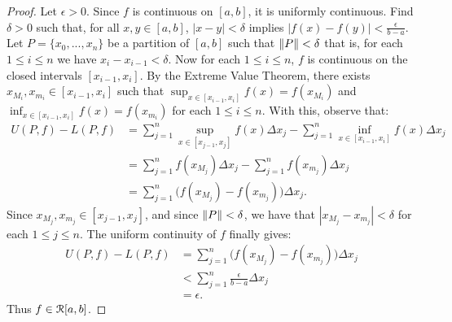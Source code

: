 \documentclass[11pt,twoside,openany]{memoir}
\begin{document}
        \begin{proof}
            Let $\epsilon > 0$. Since $f$ is continuous on $[a,b]$, it is uniformly continuous. Find $\delta > 0$ such that, for all $x,y \in [a,b]$, $|x-y| < \delta$ implies $|f(x) - f(y)| < \frac{\epsilon}{b-a}$. Let $P = \{x_0,...,x_n\}$ be a partition of $[a,b]$ such that $\left\lVert P \right\rVert < \delta$ \textemdash that is, for each $1 \leq i \leq n$ we have $x_i - x_{i-1} < \delta$. Now for each $1 \leq i \leq n$, $f$ is continuous on the closed intervals $[x_{i-1},x_i]$. By the Extreme Value Theorem, there exists $x_{M_i},x_{m_i} \in [x_{i-1},x_i]$ such that $\sup_{x \in [x_{i-1},x_i]}f(x) = f(x_{M_i})$ and $\inf_{x \in [x_{i-1},x_i]}f(x) = f(x_{m_i})$ for each $1 \leq i \leq n$. With this, observe that:
                \begin{equation*}
                \begin{split}
                    U(P,f) - L(P,f) 
                    & = \sum_{j = 1}^n \sup_{x \in [x_{j-1},x_j]}f(x)\Delta x_j - \sum_{j = 1}^n \inf_{x \in [x_{i-1},x_i]}f(x)\Delta x_j \\
                    & = \sum_{j = 1}^n f(x_{M_j})\Delta x_j - \sum_{j = 1}^n f(x_{m_j})\Delta x_j \\
                    & = \sum_{j=1}^n \bigl(f(x_{M_j}) - f(x_{m_j})\bigr)\Delta x_j.
                \end{split}
                \end{equation*}
            Since $x_{M_j},x_{m_j} \in [x_{j-1},x_j]$, and since $\left\lVert P \right\rVert < \delta$, we have that $|x_{M_j} - x_{m_j}| < \delta$ for each $1 \leq j \leq n$. The uniform continuity of $f$ finally gives:
                \begin{equation*}
                \begin{split}
                    U(P,f) - L(P,f)
                    & = \sum_{j=1}^n \bigl(f(x_{M_j}) - f(x_{m_j})\bigr)\Delta x_j \\
                    & < \sum_{j = 1}^n \frac{\epsilon}{b-a} \Delta x_j \\
                    & = \epsilon.
                \end{split}
                \end{equation*}
            Thus $f \in \mathcal{R}[a,b]$.
        \end{proof}
\end{document}
